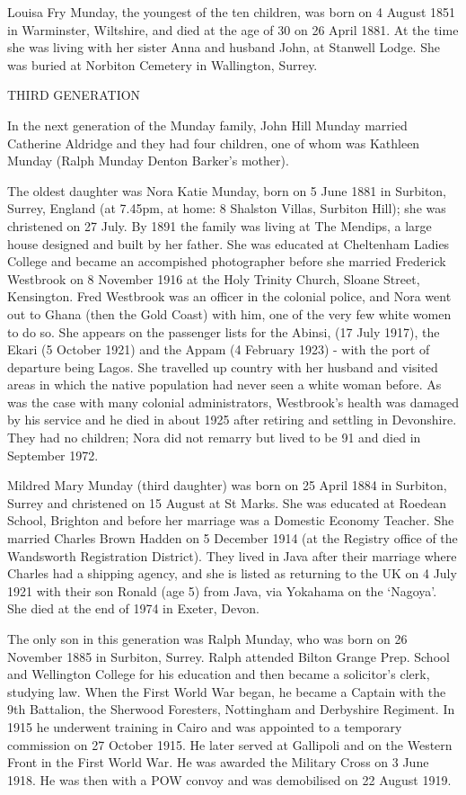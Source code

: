 Louisa Fry Munday, the youngest of the ten children, was born on 4 August 1851 in Warminster, Wiltshire, and died at the age of 30 on 26 April 1881. At the time she was living with her sister Anna and husband John, at Stanwell Lodge. She was buried at Norbiton Cemetery in	Wallington, Surrey. 


THIRD GENERATION

In the next generation of the Munday family, John Hill Munday married Catherine Aldridge and they had four children, one of whom was Kathleen Munday (Ralph Munday Denton Barker's mother). 

The oldest daughter was Nora Katie Munday, born on 5 June 1881 in Surbiton, Surrey, England (at 7.45pm, at home: 8 Shalston Villas, Surbiton Hill); she was christened on 27 July. By 1891 the family was living at The Mendips, a large house designed and built by her father. She was educated at Cheltenham Ladies College and became an accompished photographer before she married Frederick Westbrook on 8 November 1916 at the	Holy Trinity Church, Sloane Street, Kensington. Fred Westbrook  was an officer in the colonial police, and Nora went out to Ghana (then the Gold Coast) with him, one of the very few white women to do so. She appears on the passenger lists for the Abinsi, (17 July 1917), the Ekari (5 October 1921) and the Appam (4 February 1923) - with the port of departure being Lagos. She travelled up country with her husband and visited areas in which the native population had never seen a white woman before. As was the case with many colonial administrators, Westbrook's health was damaged by his service and he died in about 1925 after retiring and settling in Devonshire. They had no children; Nora did not remarry but lived to be 91 and died in September 1972. 

Mildred Mary Munday (third daughter) was born on 25 April 1884 in	Surbiton, Surrey and christened on 15 August at St Marks. She was educated at Roedean School, Brighton and before her marriage was a Domestic Economy Teacher. She married Charles Brown Hadden on 5 December 1914 (at the Registry office of the Wandsworth Registration District). They lived in Java after their marriage where Charles had a shipping agency, and she is listed as returning to the UK on 4 July 1921 with their son Ronald (age 5) from Java, via Yokahama on the `Nagoya'.  She died at the end of 
1974 in	Exeter, Devon.

The only son in this generation was Ralph Munday, who was born on 26 November 1885 in Surbiton, Surrey.  Ralph attended Bilton Grange Prep. School and Wellington College for his education and then became a solicitor's clerk, studying law. When the First World War began, he became a Captain with the 9th Battalion, the Sherwood Foresters, Nottingham and Derbyshire Regiment. In 1915 he underwent training in Cairo and was appointed to a temporary commission on 27 October 1915. He later served at Gallipoli and on the Western Front in the First World War. He was awarded the Military Cross on 3 June 1918. He was then with a POW convoy and was demobilised on 22 August 1919.

